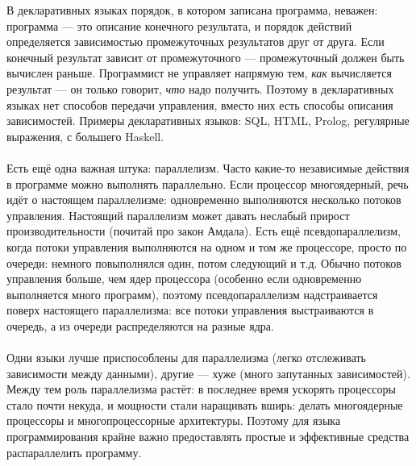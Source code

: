 \documentclass[11pt]{book}
\begin{document}
В декларативных языках порядок, в котором записана программа, неважен:
программа --- это описание конечного результата, и порядок действий определяется зависимостью
промежуточных результатов друг от друга.
Если конечный результат зависит от промежуточного --- промежуточный должен быть вычислен раньше.
Программист не управляет напрямую тем, \emph{как} вычисляется результат --- он только говорит, \emph{что} надо получить.
Поэтому в декларативных языках нет способов передачи управления, вместо них есть способы описания зависимостей.
Примеры декларативных языков: SQL, HTML, Prolog, регулярные выражения, с большего Haskell.
\\ \\
Есть ещё одна важная штука: параллелизм.
Часто какие-то независимые действия в программе можно выполнять параллельно.
Если процессор многоядерный, речь идёт о настоящем параллелизме: одновременно выполняются несколько потоков управления.
Настоящий параллелизм может давать неслабый прирост производительности (почитай про закон Амдала).
Есть ещё псевдопараллелизм, когда потоки управления выполняются на одном и том же процессоре,
просто по очереди: немного повыполнялся один, потом следующий и т.д.
Обычно потоков управления больше, чем ядер процессора (особенно если одновременно выполняется много программ),
поэтому псевдопараллелизм надстраивается поверх настоящего параллелизма:
все потоки управления выстраиваются в очередь, а из очереди распределяются на разные ядра.
\\ \\
Одни языки лучше приспособлены для параллелизма (легко отслеживать зависимости между данными),
другие --- хуже (много запутанных зависимостей).
Между тем роль параллелизма растёт: в последнее время ускорять процессоры стало почти некуда,
и мощности стали наращивать вширь: делать многоядерные процессоры и многопроцессорные архитектуры.
Поэтому для языка программирования крайне важно предоставлять простые и эффективные средства распараллелить программу.
\end{document}
